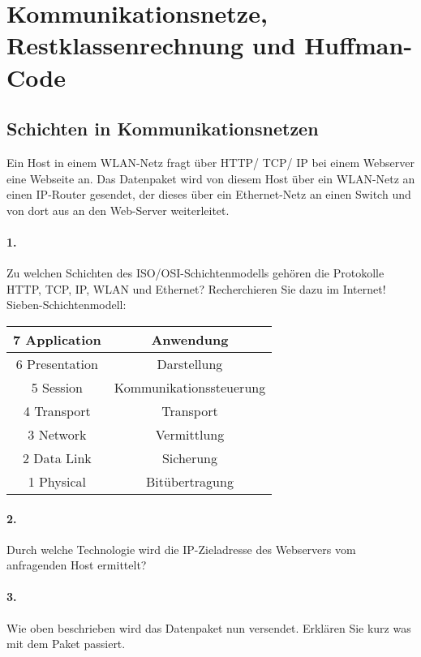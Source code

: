 \documentclass[paper=a4, fontsize=11pt]{scrartcl}
\numberwithin{equation}{section}
\numberwithin{figure}{section}
\numberwithin{table}{section}
\begin{document}

\section{Kommunikationsnetze, Restklassenrechnung und Huffman-Code}

\subsection{Schichten in Kommunikationsnetzen}
Ein Host in einem WLAN-Netz fragt über HTTP/ TCP/ IP bei einem Webserver eine Webseite an. Das Datenpaket wird von diesem Host über ein WLAN-Netz an einen IP-Router gesendet, der dieses über ein Ethernet-Netz an einen Switch und von dort aus an den Web-Server weiterleitet. \\

\paragraph{1.}
Zu welchen Schichten des ISO/OSI-Schichtenmodells gehören die Protokolle HTTP, TCP, IP, WLAN und Ethernet? Recherchieren Sie dazu im Internet! \\

Sieben-Schichtenmodell: \\
\begin{tabular}{|c|c|}
\hline
7 Application & Anwendung \\
\hline
6 Presentation & Darstellung \\
\hline
5 Session & Kommunikationssteuerung \\
\hline
4 Transport & Transport \\
\hline
3 Network & Vermittlung \\
\hline
2 Data Link & Sicherung \\
\hline
1 Physical & Bitübertragung\\
\hline
\end{tabular}

\paragraph{2.}
Durch welche Technologie wird die IP-Zieladresse des Webservers vom anfragenden Host ermittelt? \\

\paragraph{3.}
Wie oben beschrieben wird das Datenpaket nun versendet. Erklären Sie kurz was mit dem Paket passiert.
\end{document}
